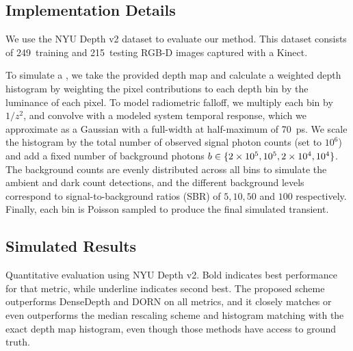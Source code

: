 


\subsection{Implementation Details}

We use the NYU Depth v2 dataset to evaluate our method. This dataset consists of
249~training and 215~testing RGB-D images captured with a Kinect.

To simulate a , we take the provided depth map and 
calculate a weighted depth histogram by weighting the pixel contributions to
each depth bin by the luminance of each pixel. To model radiometric falloff, we
multiply each bin by $1/z^2$, and convolve with a modeled system temporal
response, which we approximate as a Gaussian with a full-width at half-maximum of 70~ps. We scale
the histogram by the total number of observed signal photon counts (set to 
$10^6$) and  add a fixed number of background photons $b \in \{2\times 10^5, 10^5, 2\times
10^4, 10^4\}$. The background counts are evenly distributed across all bins to simulate the ambient and dark
count detections, and the different background levels correspond to
signal-to-background ratios (SBR) of $5, 10, 50$ and $100$ respectively. Finally,
each bin is Poisson sampled to produce the final simulated transient.

\subsection{Simulated Results}
\begin{table*}[!t]
  \begin{center}
   {\fontsize{7pt}{8pt}\selectfont 
      
   } 
\caption{
  Quantitative evaluation using NYU Depth v2. Bold indicates best
performance for that metric, while underline indicates second best. The proposed
scheme outperforms DenseDepth and DORN on all metrics, and it closely matches or
even outperforms the median rescaling scheme and histogram matching with the
exact depth map histogram, even though those methods have access to ground
truth.}
\label{tab:comparison}
\end{center}
\end{table*}


